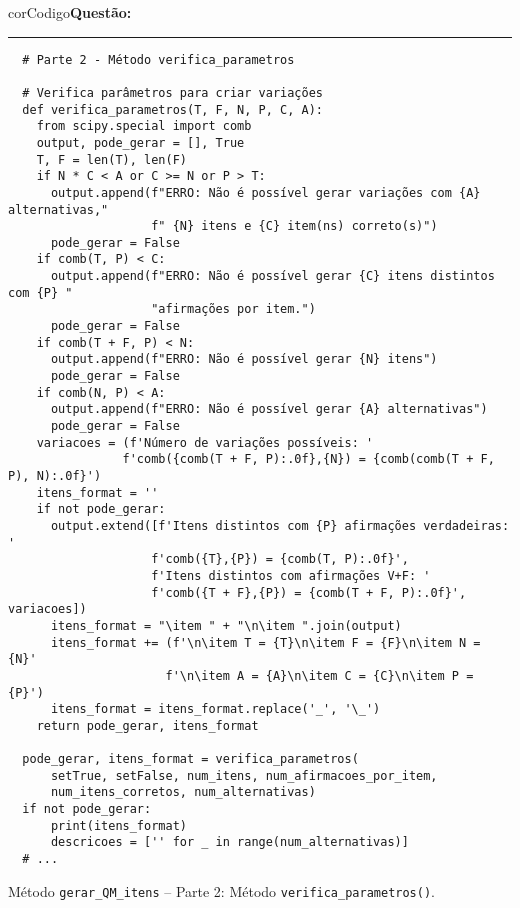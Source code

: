 \begin{listing}[!ht]
  \begin{myboxCode}{corCodigo}{\textbf{Questão: }}\vspace{3mm}
  \hrule
  \begin{verbatim}
  # Parte 2 - Método verifica_parametros

  # Verifica parâmetros para criar variações
  def verifica_parametros(T, F, N, P, C, A):
    from scipy.special import comb
    output, pode_gerar = [], True
    T, F = len(T), len(F)
    if N * C < A or C >= N or P > T:
      output.append(f"ERRO: Não é possível gerar variações com {A} alternativas,"
                    f" {N} itens e {C} item(ns) correto(s)")
      pode_gerar = False
    if comb(T, P) < C:
      output.append(f"ERRO: Não é possível gerar {C} itens distintos com {P} "
                    "afirmações por item.")
      pode_gerar = False
    if comb(T + F, P) < N:
      output.append(f"ERRO: Não é possível gerar {N} itens")
      pode_gerar = False
    if comb(N, P) < A:
      output.append(f"ERRO: Não é possível gerar {A} alternativas")
      pode_gerar = False
    variacoes = (f'Número de variações possíveis: '
                f'comb({comb(T + F, P):.0f},{N}) = {comb(comb(T + F, P), N):.0f}')
    itens_format = ''
    if not pode_gerar:
      output.extend([f'Itens distintos com {P} afirmações verdadeiras: '
                    f'comb({T},{P}) = {comb(T, P):.0f}',
                    f'Itens distintos com afirmações V+F: '
                    f'comb({T + F},{P}) = {comb(T + F, P):.0f}', variacoes])
      itens_format = "\item " + "\n\item ".join(output)
      itens_format += (f'\n\item T = {T}\n\item F = {F}\n\item N = {N}'
                      f'\n\item A = {A}\n\item C = {C}\n\item P = {P}')
      itens_format = itens_format.replace('_', '\_')
    return pode_gerar, itens_format

  pode_gerar, itens_format = verifica_parametros(
      setTrue, setFalse, num_itens, num_afirmacoes_por_item,
      num_itens_corretos, num_alternativas)
  if not pode_gerar:
      print(itens_format)
      descricoes = ['' for _ in range(num_alternativas)]
  # ...
\end{verbatim}
\end{myboxCode}
\caption{Método \texttt{gerar\_QM\_itens} -- Parte 2: Método \texttt{verifica\_parametros()}.}
\label{lst:questaoQM_gerar_QM_itens_parte2}
\end{listing}

